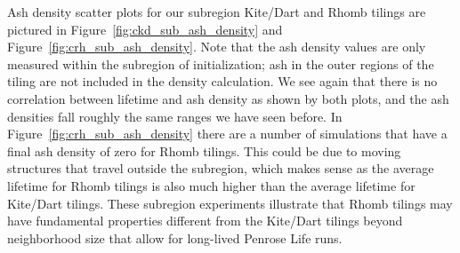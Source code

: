 \documentclass[a4paper,11pt]{report}
\begin{document}
Ash density scatter plots for our subregion Kite/Dart and Rhomb tilings are pictured in Figure~\ref{fig:ckd_sub_ash_density} and Figure~\ref{fig:crh_sub_ash_density}. Note that the ash density values are only measured within the subregion of initialization; ash in the outer regions of the tiling are not included in the density calculation. We see again that there is no correlation between lifetime and ash density as shown by both plots, and the ash densities fall roughly the same ranges we have seen before. In Figure~\ref{fig:crh_sub_ash_density} there are a number of simulations that have a final ash density of zero for Rhomb tilings. This could be due to moving structures that travel outside the subregion, which makes sense as the average lifetime for Rhomb tilings is also much higher than the average lifetime for Kite/Dart tilings. These subregion experiments illustrate that Rhomb tilings may have fundamental properties  different from the Kite/Dart tilings beyond neighborhood size that allow for long-lived Penrose Life runs. 
\end{document}
